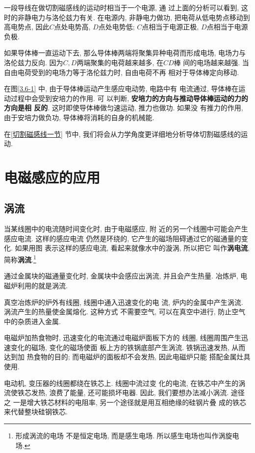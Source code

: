 \documentclass[11pt,a4paper]{ctexbook}
\begin{document}
一段导线在做切割磁感线的运动时相当于一个电源, 通
过上面的分析可以看到, 这时的非静电力与洛伦兹力有关.
在电源内, 非静电力做功, 把电荷从低电势点移动到高电势点,
因此$C$点处电势高, $D$点处电势低; $C$点相当于电源正极,
$D$点相当于电源负极.

如果导体棒一直运动下去, 那么导体棒两端将聚集异种电荷而形成电场,
电场力与洛伦兹力反向. 因为$C, D$两端聚集的电荷越来越多, 在$CD$棒
间的电场越来越强. 当自由电荷受到的电场力等于洛伦兹力时, 自由电荷不再
相对于导体棒定向移动.

在图\ref{3.6-1} 中, 由于导体棒运动产生感应电动势, 电路中有
电流通过, 导体棒在运动过程中会受到安培力的作用. 可
以判断, \textbf{安培力的方向与推动导体棒运动的力的方向是相
反的}. 这时即使导体棒做匀速运动, 推力也做功. 如果没
有推力的作用, 由于安培力做负功, 导体棒将消耗的自身的机械能.

在\ref{切割磁感线一节} 节中, 我们将会从力学角度更详细地分析导体切割磁感线的运动.

\section{电磁感应的应用}

\subsection{涡流}\label{涡流}
当某线圈中的电流随时间变化时, 由于电磁感应, 附
近的另一个线圈中可能会产生感应电流. 这样的感应电流
仍然是环绕的, 它产生的磁场阻碍通过它的磁通量的变化. 如果用图
表示这样的感应电流, 看起来就像水中的漩涡, 所以把它
叫作\textbf{涡电流}, 简称\textbf{涡流}.\footnote{形成涡流的电场
不是恒定电场, 而是感生电场. 所以感生电场也叫作涡旋电场.}

通过金属块的磁通量变化时, 金属块中会感应出涡流,
并且会产生热量. 冶炼炉, 电磁炉利用的就是涡流.

真空冶炼炉的炉外有线圈, 线圈中通入迅速变化的电
流, 炉内的金属中产生涡流. 涡流产生的热量使金属熔化. 这种方式
不需要空气, 可以在真空中进行, 防止空气中的杂质进入金属.

电磁炉加热食物时, 迅速变化的电流通过电磁炉面板下方的
线圈, 线圈周围产生迅速变化的磁场, 变化的磁场使面
板上方的铁锅底部产生涡流. 铁锅迅速发热, 从而达到加
热食物的目的; 而电磁炉的面板却不会发热, 因此电磁炉只能
搭配金属灶具使用.

电动机, 变压器的线圈都绕在铁芯上. 线圈中流过变
化的电流, 在铁芯中产生的涡流使铁芯发热, 浪费了能量,
还可能损坏电器. 因此, 我们要想办法减小涡流. 途径之
一是增大铁芯材料的电阻率, 另一个途径就是用互相绝缘的硅钢片叠
成的铁芯来代替整块硅钢铁芯.
\end{document}
